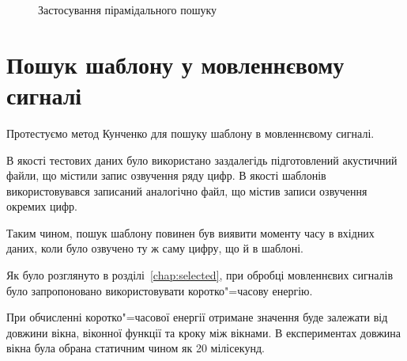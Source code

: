 \begin{figure}[h]

        \caption{Застосування пірамідального пошуку}
        \label{fig:simple-signal-kun-p}
    \end{figure}
    \clearpage

\section{Пошук шаблону у мовленнєвому сигналі}
    Протестуємо метод Кунченко для пошуку шаблону в мовленнєвому сигналі.

    В якості тестових даних було використано заздалегідь підготовлений акустичний файли, що містили запис озвучення
    ряду цифр.
    В якості шаблонів використовувався записаний аналогічно файл, що містив записи озвучення окремих цифр.

    Таким чином, пошук шаблону повинен був виявити моменту часу в вхідних даних, коли було озвучено ту ж саму цифру,
    що й в шаблоні.

    Як було розглянуто в розділі~\ref{chap:selected}, при обробці мовленнєвих сигналів було запропоновано
    використовувати коротко"=часову енергію.

    При обчисленні коротко"=часової енергії отримане значення буде залежати від довжини вікна, віконної функції та
    кроку між вікнами.
    В експериментах довжина вікна була обрана статичним чином як 20 мілісекунд.

